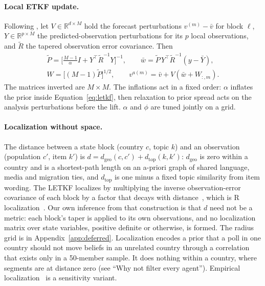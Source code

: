 \documentclass[10pt]{article}
\theoremstyle{remark}
\newcommand{\R}{\mathbb{R}}
\begin{document}
\paragraph{Local ETKF update.} Following \citet{hunt2007}, let $V\in\R^{d\times M}$ hold the forecast perturbations $v^{(m)}-\bar v$ for block $\ell$, $Y\in\R^{p\times M}$ the predicted-observation perturbations for its $p$ local observations, and $\tilde R$ the tapered observation error covariance. Then
\begin{equation}
\begin{gathered}
\tilde P = \Big[\tfrac{M-1}{\alpha} I + Y^\top \tilde R^{-1} Y\Big]^{-1},\qquad
\bar w = \tilde P\, Y^\top \tilde R^{-1}(y-\bar Y),\\
W = \big[(M-1)\tilde P\big]^{1/2},\qquad
v^{a(m)} = \bar v + V(\bar w + W_{:,m}).
\end{gathered}
\label{eq:letkf}
\end{equation}
The matrices inverted are $M\times M$. The inflations act in a fixed order: $\alpha$ inflates the prior inside Equation~\eqref{eq:letkf}, then relaxation to prior spread acts on the analysis perturbations before the lift. $\alpha$ and $\phi$ are tuned jointly on a grid.

\paragraph{Localization without space.} The distance between a state block (country $c$, topic $k$) and an observation (population $c'$, item $k'$) is $d = d_{\mathrm{geo}}(c,c') + d_{\mathrm{top}}(k,k')$: $d_{\mathrm{geo}}$ is zero within a country and is a shortest-path length on an a-priori graph of shared language, media and migration ties, and $d_{\mathrm{top}}$ is one minus a fixed topic similarity from item wording. The LETKF localizes by multiplying the inverse observation-error covariance of each block by a factor that decays with distance~\cite{hunt2007}, which is R localization~\cite{greybush2011}. Our own inference from that construction is that $d$ need not be a metric: each block's taper is applied to its own observations, and no localization matrix over state variables, positive definite or otherwise, is formed. The radius grid is in Appendix~\ref{app:deferred}. Localization encodes a prior that a poll in one country should not move beliefs in an unrelated country through a correlation that exists only in a 50-member sample. It does nothing within a country, where segments are at distance zero (see ``Why not filter every agent''). Empirical localization~\cite{andersonlei2013} is a sensitivity variant.
\end{document}
